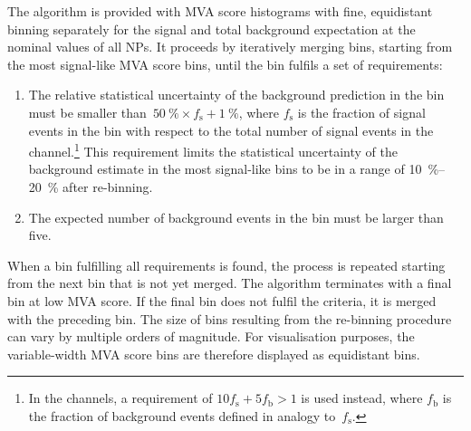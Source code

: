 The algorithm is provided with MVA score histograms with fine, equidistant
binning separately for the signal and total background expectation at the
nominal values of all NPs. It proceeds by iteratively merging bins, starting
from the most signal-like MVA score bins, until the bin fulfils a set of
requirements:
\begin{enumerate}

\item The relative statistical uncertainty of the background prediction in the
  bin must be smaller
  than~\mbox{$\SI{50}{\percent} \times f_\text{s} + \SI{1}{\percent}$}, where
  $f_\text{s}$ is the fraction of signal events in the bin with respect to the
  total number of signal events in the channel.\footnote{In the \lephad
    channels, a requirement of $10 f_{\text{s}} + 5 f_{\text{b}} > 1$ is used
    instead, where $f_{\text{b}}$ is the fraction of background events defined
    in analogy to~$f_{\text{s}}$.} This requirement limits the statistical
  uncertainty of the background estimate in the most signal-like bins to be in a
  range of \SIrange{10}{20}{\percent} after re-binning.

\item The expected number of background events in the bin must be larger than
  five.

\end{enumerate}
When a bin fulfilling all requirements is found, the process is repeated
starting from the next bin that is not yet merged. The algorithm terminates with
a final bin at low MVA score. If the final bin does not fulfil the criteria, it
is merged with the preceding bin.
The size of bins resulting from the re-binning procedure can vary by multiple
orders of magnitude. For visualisation purposes, the variable-width MVA score
bins are therefore displayed as equidistant bins.




